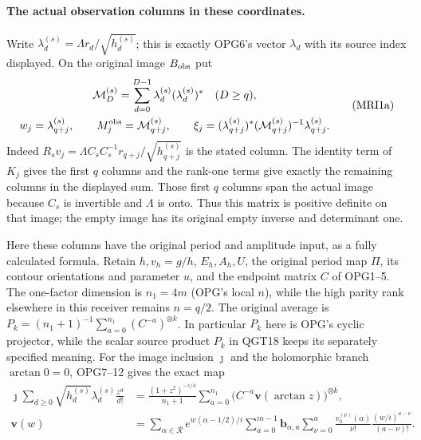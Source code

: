 \documentclass[11pt,a4paper]{article}
\begin{document}
\paragraph{The actual observation columns in these coordinates.}
Write $\lambda_d^{(s)}=\Lambda r_d/\sqrt{h_d^{(s)}}$;
this is exactly OPG6's vector $\lambda_d$ with its source index
displayed. On the original image $B_{\rm obs}$ put
\[
\begin{gathered}
 \mathcal M_D^{(s)}=\sum_{d=0}^{D-1}
                \lambda_d^{(s)}(\lambda_d^{(s)})^*\quad(D\ge q),\\
 w_j=\lambda_{q+j}^{(s)},\qquad
 M_j^{\rm obs}=\mathcal M_{q+j}^{(s)},\qquad
 \xi_j=(\lambda_{q+j}^{(s)})^*
            (\mathcal M_{q+j}^{(s)})^{-1}\lambda_{q+j}^{(s)}.
\end{gathered}\tag{MRI1a}
\]
Indeed $R_sv_j=\Lambda C_sC_s^{-1}r_{q+j}/\sqrt{h_{q+j}^{(s)}}$
is the stated column. The identity term of $K_j$ gives the first
$q$ columns and the rank-one terms give exactly the remaining
columns in the displayed sum. Those first $q$ columns span the
actual image because $C_s$ is invertible and $\Lambda$ is onto.
Thus this matrix is positive definite on that image; the empty
image has its original empty inverse and determinant one.

Here these columns have the original period and amplitude input,
as a fully calculated formula. Retain $h,v_h=g/h$, $E_h,A_h,U$,
the original period map $\Pi$, its contour orientations and
parameter $u$, and the endpoint matrix $C$ of OPG1--5. The
one-factor dimension is $n_1=4m$ (OPG's local $n$), while the
high parity rank elsewhere in this receiver remains $n=q/2$.
The original average is
$P_k=(n_1+1)^{-1}\sum_{a=0}^{n_1}(C^{-a})^{\otimes k}$.
In particular $P_k$ here is OPG's cyclic projector, while the
scalar source product $P_k$ in QGT18 keeps its separately
specified meaning. For the image inclusion $\jmath$ and the
holomorphic branch $\arctan0=0$, OPG7--12 gives the exact map
\[
\begin{split}
 \jmath\sum_{d\ge0}\sqrt{h_d^{(s)}}\lambda_d^{(s)}\frac{z^d}{d!}
 &=\frac{(1+z^2)^{-s/4}}{n_1+1}
       \sum_{a=0}^{n_1}
          \bigl(C^{-a}\mathbf v(\arctan z)\bigr)^{\otimes k},\\
 \mathbf v(w)
 &=\sum_{\alpha\in\mathcal R}e^{w(\alpha-1/2)/i}
       \sum_{a=0}^{m-1}\mathbf b_{\alpha,a}
       \sum_{\nu=0}^{a}\frac{v_h^{(\nu)}(\alpha)}{\nu!}
                       \frac{(w/i)^{a-\nu}}{(a-\nu)!}.
\end{split}\tag{MRI1b}
\]
\end{document}
